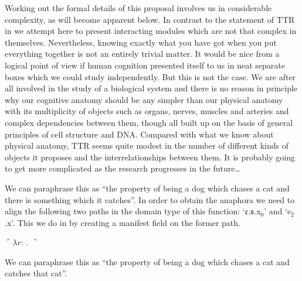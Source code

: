 Working out the formal details of this proposal involves us in
considerable complexity, as will become apparent below.  In contrast
to the statement of TTR in \cite{Cooper2005} we attempt here to
present interacting modules which are not that complex in themselves.
Nevertheless, knowing exactly what you have got when you put
everything together is not an entirely trivial matter.  It would be
nice from a logical point of view if human cognition presented itself
to us in neat separate boxes which we could study independently.  But
this is not the case.  We
are after all involved in the study of a biological system and there
is no reason in principle why our cognitive anatomy should be any
simpler than our physical anatomy with its multiplicity of objects
such as organs, nerves, muscles and arteries and complex dependencies
between them, though all built up on the basis of general principles
of cell structure and DNA.  Compared with what we know about physical
anatomy,  TTR seems quite modest in the number of different kinds of
objects it proposes and the interrelationships between them.  It is
probably going to get more complicated as the research progresses in
the future\ldots


We can paraphrase this as ``the property of being a dog which chases a
cat and there is something which it catches''.  In order to obtain the
anaphora we need to align the following two paths in the domain type
of this function: `$\mathfrak{c}.\mathfrak{s}.\text{x}_0$' and
`e$_2$.x'.  This we do in \nexteg{} by creating a manifest field on
the former path.

\begin{ex} 
  $\ulcorner\lambda r$:
   .
  $\urcorner$
\end{ex}
We can paraphrase this as ``the property of being a dog which chases a
cat and catches that cat''.

